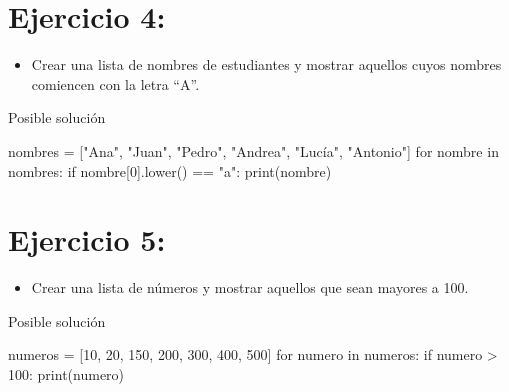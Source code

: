\documentclass[
  a4paper,
  DIV=11,
  numbers=noendperiod,
  onepage,
  openany]{scrreprt}
\newenvironment{Shaded}{\begin{snugshade}}{\end{snugshade}}
\newcommand{\BuiltInTok}[1]{\textcolor[rgb]{0.00,0.23,0.31}{#1}}
\newcommand{\ControlFlowTok}[1]{\textcolor[rgb]{0.00,0.23,0.31}{#1}}
\newcommand{\DecValTok}[1]{\textcolor[rgb]{0.68,0.00,0.00}{#1}}
\newcommand{\KeywordTok}[1]{\textcolor[rgb]{0.00,0.23,0.31}{#1}}
\newcommand{\NormalTok}[1]{\textcolor[rgb]{0.00,0.23,0.31}{#1}}
\newcommand{\OperatorTok}[1]{\textcolor[rgb]{0.37,0.37,0.37}{#1}}
\newcommand{\StringTok}[1]{\textcolor[rgb]{0.13,0.47,0.30}{#1}}
\providecommand{\tightlist}{%
  \setlength{\itemsep}{0pt}\setlength{\parskip}{0pt}}\usepackage{longtable,booktabs,array}
\begin{document}
\section{Ejercicio 4:}\label{ejercicio-4-3}

\begin{itemize}
\tightlist
\item
  Crear una lista de nombres de estudiantes y mostrar aquellos cuyos
  nombres comiencen con la letra ``A''.
\end{itemize}

Posible solución

\begin{Shaded}
\begin{Highlighting}[]
\NormalTok{nombres }\OperatorTok{=}\NormalTok{ [}\StringTok{"Ana"}\NormalTok{, }\StringTok{"Juan"}\NormalTok{, }\StringTok{"Pedro"}\NormalTok{, }\StringTok{"Andrea"}\NormalTok{, }\StringTok{"Lucía"}\NormalTok{, }\StringTok{"Antonio"}\NormalTok{]}
\ControlFlowTok{for}\NormalTok{ nombre }\KeywordTok{in}\NormalTok{ nombres:}
    \ControlFlowTok{if}\NormalTok{ nombre[}\DecValTok{0}\NormalTok{].lower() }\OperatorTok{==} \StringTok{"a"}\NormalTok{:}
        \BuiltInTok{print}\NormalTok{(nombre)}
\end{Highlighting}
\end{Shaded}

\section{Ejercicio 5:}\label{ejercicio-5-3}

\begin{itemize}
\tightlist
\item
  Crear una lista de números y mostrar aquellos que sean mayores a 100.
\end{itemize}

Posible solución

\begin{Shaded}
\begin{Highlighting}[]
\NormalTok{numeros }\OperatorTok{=}\NormalTok{ [}\DecValTok{10}\NormalTok{, }\DecValTok{20}\NormalTok{, }\DecValTok{150}\NormalTok{, }\DecValTok{200}\NormalTok{, }\DecValTok{300}\NormalTok{, }\DecValTok{400}\NormalTok{, }\DecValTok{500}\NormalTok{]}
\ControlFlowTok{for}\NormalTok{ numero }\KeywordTok{in}\NormalTok{ numeros:}
    \ControlFlowTok{if}\NormalTok{ numero }\OperatorTok{\textgreater{}} \DecValTok{100}\NormalTok{:}
        \BuiltInTok{print}\NormalTok{(numero)}
\end{Highlighting}
\end{Shaded}
\end{document}
